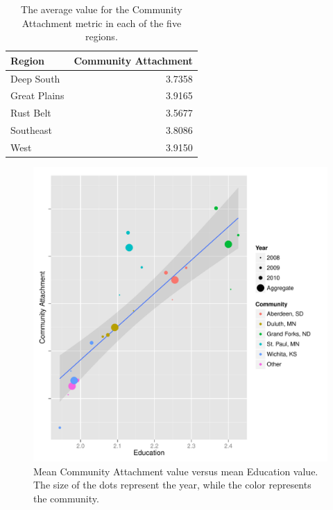 \documentclass[11pt]{article}\usepackage{knitr}
\begin{document}
\begin{table}[ht]
\centering
\begin{tabular}{lr}
  \hline
Region & Community Attachment \\ 
  \hline
Deep South & 3.7358 \\ 
  Great Plains & 3.9165 \\ 
  Rust Belt & 3.5677 \\ 
  Southeast & 3.8086 \\ 
  West & 3.9150 \\ 
   \hline
\end{tabular}
\caption{The average value for the Community Attachment metric in each of the five regions.} 
\label{tbl:cce_table}
\end{table}



\begin{knitrout}
\color{fgcolor}\begin{figure}[H]

\includegraphics[width=\maxwidth]{figure/gp_two} \caption[Mean Community Attachment value versus mean Education value]{Mean Community Attachment value versus mean Education value. The size of the dots represent the year, while the color represents the community.\label{fig:gp_two}}
\end{figure}


\end{knitrout}
\end{document}
